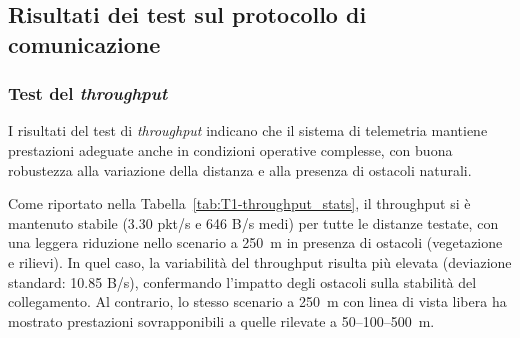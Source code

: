 \documentclass[12pt,a4paper,twoside]{book}
\begin{document}
\subsection{Risultati dei test sul protocollo di comunicazione}
\subsubsection{Test del \emph{throughput}}
I risultati del test di \emph{throughput} indicano che il sistema di telemetria
mantiene prestazioni adeguate anche in condizioni operative complesse, con buona
robustezza alla variazione della distanza e alla presenza di ostacoli naturali.

Come riportato nella Tabella~\ref{tab:T1-throughput_stats}, il throughput si è
mantenuto stabile (3.30 pkt/s e 646 B/s medi) per tutte le distanze testate, con
una leggera riduzione nello scenario a 250~m in presenza di ostacoli (vegetazione
e rilievi). In quel caso, la variabilità del throughput risulta più elevata
(deviazione standard: 10.85 B/s), confermando l'impatto degli ostacoli sulla
stabilità del collegamento. Al contrario, lo stesso scenario a 250~m con linea
di vista libera ha mostrato prestazioni sovrapponibili a quelle rilevate a 50–100–500~m.
\end{document}
